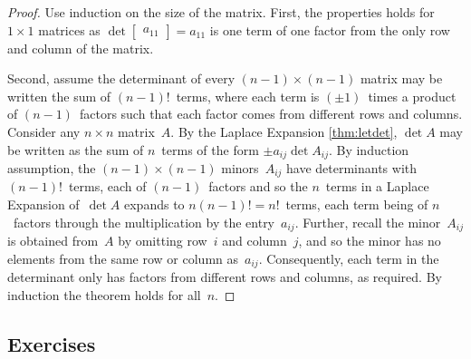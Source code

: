 \begin{proof} 
Use induction on the size of the matrix.
First, the properties holds for \(1\times 1\) matrices as \(\det\begin{bmatrix} a_{11} \end{bmatrix}=a_{11}\) is one term of one factor from the only row and column of the matrix.

Second, assume the determinant of every \((n-1)\times (n-1)\) matrix may be written the sum of \((n-1)!\)~terms, where each term is \((\pm1)\)~times a product of \((n-1)\)~factors such that each factor comes from different rows and columns.
Consider any \(n\times n\) matrix~\(A\).
By the Laplace Expansion \autoref{thm:letdet}, \(\det A\) may be written as the sum of \(n\)~terms of the form \(\pm a_{ij}\det A_{ij}\).
By induction assumption, the \((n-1)\times(n-1)\) minors~\(A_{ij}\) have determinants with \((n-1)!\)~terms, each of \((n-1)\)~factors and so the \(n\)~terms in a Laplace Expansion of~\(\det A\) expands to \(n(n-1)!=n!\)~terms, each term being of \(n\)~factors through the multiplication by the entry~\(a_{ij}\).
Further, recall the minor~\(A_{ij}\) is obtained from~\(A\) by omitting row~\(i\) and column~\(j\), and so the minor has no elements from the same row or column as~\(a_{ij}\).
Consequently, each term in the determinant only has factors from different rows and columns, as required.
By induction the theorem holds for all~\(n\).
\end{proof}





\begin{comment}
\nakos{} has an interesting section on using determinants to fit some interesting curves, and other determinant uses: such material could go here.
\end{comment}






\subsection{Exercises}




